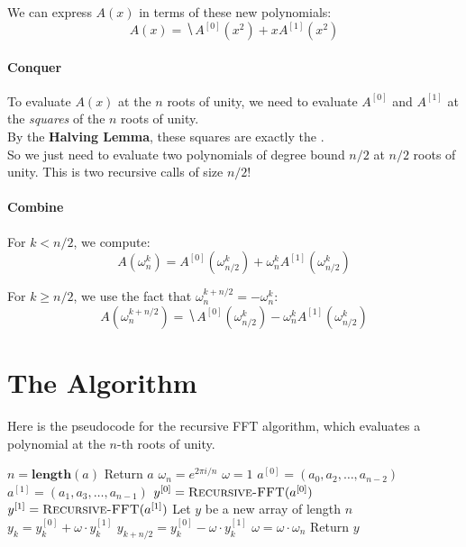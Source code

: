 \documentclass[11  pt]{article}
\begin{document}
We can express $A(x)$ in terms of these new polynomials:
\begin{equation*}
    A(x) = \hide{A^{[0]}(x^2) + x A^{[1]}(x^2)}
\end{equation*}

\paragraph{Conquer}
To evaluate $A(x)$ at the $n$ roots of unity, we need to evaluate $A^{[0]}$ and $A^{[1]}$ at the \emph{squares} of the $n$ roots of unity. \\

By the \textbf{Halving Lemma}, these squares are exactly the . \\

So we just need to evaluate two polynomials of degree bound $n/2$ at $n/2$ roots of unity. This is two recursive calls of size $n/2$!

\paragraph{Combine}
For $k < n/2$, we compute:
\begin{equation*}
    A(\omega_n^k) = A^{[0]}(\omega_{n/2}^k) + \omega_n^k A^{[1]}(\omega_{n/2}^k)
\end{equation*}

For $k \geq n/2$, we use the fact that $\omega_n^{k + n/2} = -\omega_n^k$:
\begin{equation*}
    A(\omega_n^{k + n/2}) = \hide{A^{[0]}(\omega_{n/2}^k) - \omega_n^k A^{[1]}(\omega_{n/2}^k)}
\end{equation*}

\vs{1cm}

\newpage
\section{The Algorithm}

Here is the pseudocode for the recursive FFT algorithm, which evaluates a polynomial at the $n$-th roots of unity.

\begin{algorithm}
    \caption{Recursive-FFT($a$)}
    \begin{algorithmic}
        \State $n = \textbf{length}(a)$
        \State Return $a$
        \EndIf
        \State $\omega_n = e^{2\pi i / n}$
        \State $\omega = 1$
        \State $a^{[0]} = (a_0, a_2, \hdots, a_{n-2})$
        \State $a^{[1]} = (a_1, a_3, \hdots, a_{n-1})$
        \State $y^{[0]} = \textsc{Recursive-FFT}(a^{[0]})$
        \State $y^{[1]} = \textsc{Recursive-FFT}(a^{[1]})$
        \State Let $y$ be a new array of length $n$
            \State $y_k = y^{[0]}_k + \omega \cdot y^{[1]}_k$
            \State $y_{k + n/2} = y^{[0]}_k - \omega \cdot y^{[1]}_k$
            \State $\omega = \omega \cdot \omega_n$
        \EndFor
        \State Return $y$
    \end{algorithmic}
\end{algorithm}
\end{document}
